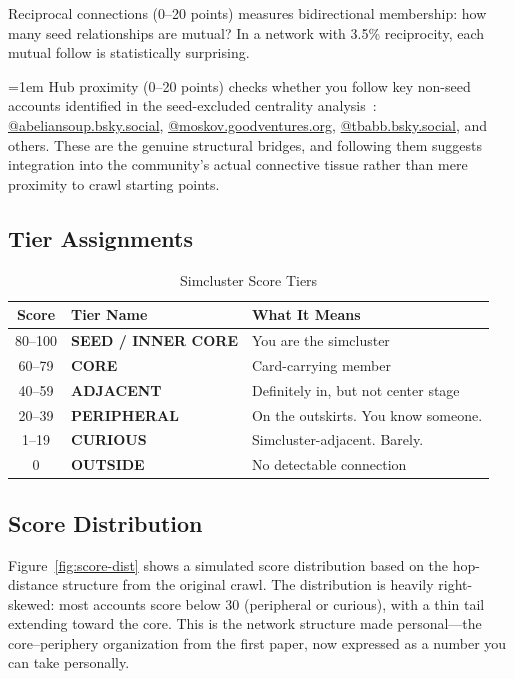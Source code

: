 \documentclass[11pt,a4paper]{article}
\begin{document}
Reciprocal connections (0--20 points) measures bidirectional membership: how many seed relationships are mutual? In a network with 3.5\% reciprocity, each mutual follow is statistically surprising.

{\emergencystretch=1em Hub proximity (0--20 points) checks whether you follow key non-seed accounts identified in the seed-excluded centrality analysis~\cite{simcluster-paper}: \url{@abeliansoup.bsky.social}, \url{@moskov.goodventures.org}, \url{@tbabb.bsky.social}, and others. These are the genuine structural bridges, and following them suggests integration into the community's actual connective tissue rather than mere proximity to crawl starting points.\par}

\subsection{Tier Assignments}

\begin{table}[H]
\centering
\caption{Simcluster Score Tiers}
\label{tab:tiers}
\begin{tabular}{cll}
    \toprule
    Score & Tier Name & What It Means \\
    \midrule
    80--100 & \textbf{SEED / INNER CORE} & You are the simcluster \\
    60--79 & \textbf{CORE} & Card-carrying member \\
    40--59 & \textbf{ADJACENT} & Definitely in, but not center stage \\
    20--39 & \textbf{PERIPHERAL} & On the outskirts. You know someone. \\
    1--19 & \textbf{CURIOUS} & Simcluster-adjacent. Barely. \\
    0 & \textbf{OUTSIDE} & No detectable connection \\
    \bottomrule
\end{tabular}
\end{table}

\subsection{Score Distribution}

Figure~\ref{fig:score-dist} shows a simulated score distribution based on the hop-distance structure from the original crawl. The distribution is heavily right-skewed: most accounts score below 30 (peripheral or curious), with a thin tail extending toward the core. This is the network structure made personal---the core--periphery organization from the first paper, now expressed as a number you can take personally.
\end{document}
